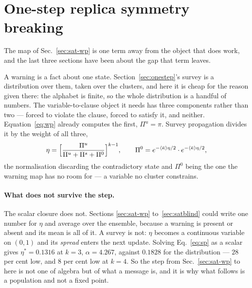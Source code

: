 \section{One-step replica symmetry breaking}
\label{sec:sat-sp}

The map of Sec.~\ref{sec:sat-wp} is one term away from the object that does
work, and the last three sections have been about the gap that term leaves.

A warning is a fact about one state. Section~\ref{sec:onestep}'s survey is a
distribution over them, taken over the clusters, and here it is cheap for the
reason given there: the alphabet is finite, so the whole distribution is a
handful of numbers. The variable-to-clause object it needs has three components
rather than two --- forced to violate the clause, forced to satisfy it, and
neither. Equation~\eqref{eq:wp} already computes the first,
$\Pi^{u}=\pi$. Survey propagation divides it by the weight of all three,
\begin{equation}
  \eta=\Bigl[\frac{\Pi^{u}}{\Pi^{u}+\Pi^{s}+\Pi^{0}}\Bigr]^{k-1},
  \qquad
  \Pi^{0}=e^{-\langle \bar\kappa \rangle\eta/2}\cdot e^{-\langle \bar\kappa \rangle\eta/2},
  \label{eq:sp}
\end{equation}
the normalisation discarding the contradictory state and $\Pi^{0}$ being the one
the warning map has no room for --- a variable no cluster constrains.

\paragraph{What does not survive the step.} The scalar closure does not. Sections
\ref{sec:sat-wp} to~\ref{sec:satblind} could write one number for $\eta$ and
average over the ensemble, because a warning is present or absent and its mean
is all of it. A survey is not: $\eta$ becomes a continuous variable on
$(0,1)$ and its \emph{spread} enters the next update. Solving
Eq.~\eqref{eq:sp} as a scalar gives $\eta^{*}=0.1316$ at $k=3$,
$\alpha=4.267$, against $0.1828$ for the distribution --- $28$ per cent low, and
$8$ per cent low at $k=4$. So the step from Sec.~\ref{sec:sat-wp} to here is not
one of algebra but of what a message is, and it is why what follows is a
population and not a fixed point.

